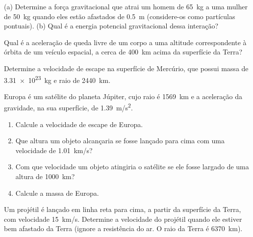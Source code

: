 \documentclass[a4paper]{article}
\begin{document}
\maketitle
 
\begin{exercicio}
  (a) Determine a força gravitacional que atrai um homem de \SI{65}{kg} a uma mulher de \SI{50}{kg} quando eles estão afastados de \SI{0.5}{m} (considere-os como partículas pontuais). (b) Qual é a energia potencial gravitacional dessa interação? 
\end{exercicio}

\begin{exercicio*}
  Qual é a aceleração de queda livre de um corpo a uma altitude correspondente à órbita de um veículo espacial, a cerca de \SI{400}{km} acima da superfície da Terra?
\end{exercicio*}

\begin{exercicio}
 Determine a velocidade de escape na superfície de Mercúrio, que possui massa de \SI{3.31e23}{kg} e raio de \SI{2440}{km}.
\end{exercicio}

\begin{exercicio}
 Europa é um satélite do planeta Júpiter, cujo raio é \SI{1569}{km} e a aceleração da gravidade, na sua superfície, de \SI{1.39}{m/s^2}.
\begin{enumerate}
\item Calcule a velocidade de escape de Europa.
\item Que altura um objeto alcançaria se fosse lançado para cima com uma velocidade de \SI{1.01}{km/s}?
\item Com que velocidade um objeto atingiria o satélite se ele fosse largado de uma altura de \SI{1000}{km}?
\item Calcule a massa de Europa.
\end{enumerate}
\end{exercicio}

\begin{exercicio}
 Um projétil é lançado em linha reta para cima, a partir da superfície da Terra, com velocidade \SI{15}{km/s}.
Determine a velocidade do projétil quando ele estiver bem afastado da Terra (ignore a resistência do ar. O raio da Terra é \SI{6370}{km}).
\end{exercicio}
\end{document}
